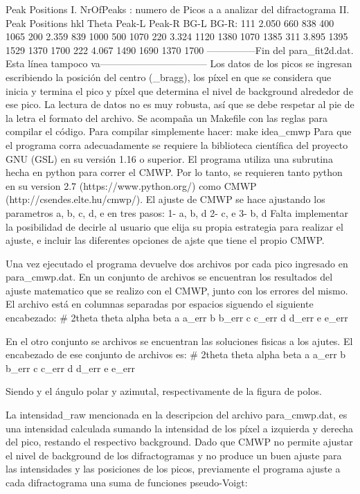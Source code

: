 Peak Positions
I. NrOfPeaks        : numero de Picos a a analizar del difractograma
II. Peak Positions
hkl Theta Peak-L Peak-R BG-L BG-R:
111 2.050 660 838 400 1065
200 2.359 839 1000 500 1070
220 3.324 1120 1380 1070 1385
311 3.895 1395 1529 1370 1700
222 4.067 1490 1690 1370 1700
---------------Fin del para_fit2d.dat. Esta línea tampoco va---------------------------------
Los datos de los picos se ingresan escribiendo la posición del centro (\theta_{bragg}), los píxel en que se considera que inicia y termina el pico y píxel que determina el nivel de background alrededor de ese pico.
La lectura de datos no es muy robusta, así que se debe respetar al pie de la letra el formato del archivo.
Se acompaña un Makefile con las reglas para compilar el código. Para compilar simplemente hacer:
make idea_cmwp
Para que el programa corra adecuadamente se requiere la biblioteca científica del proyecto GNU (GSL) en su versión 1.16 o superior.
El programa utiliza una subrutina hecha en python para correr el CMWP. Por lo tanto, se requieren tanto python en su version 2.7 (https://www.python.org/) como CMWP (http://csendes.elte.hu/cmwp/).
El ajuste de CMWP se hace ajustando los parametros a, b, c, d, e en tres pasos:
1- a, b, d
2- c, e
3- b, d
Falta implementar la posibilidad de decirle al usuario que elija su propia estrategia para realizar el ajuste, e incluir las diferentes opciones de ajste que tiene el propio CMWP.

Una vez ejecutado el programa devuelve dos archivos por cada pico ingresado en para_cmwp.dat. En un conjunto de archivos se encuentran los resultados del ajuste matematico que se realizo con el CMWP, junto con los errores del mismo. El archivo está en columnas separadas por espacios siguendo el siguiente encabezado:
#    2theta theta  alpha  beta     a a_err b b_err c c_err d d_err e e_err

En el otro conjunto se archivos se encuentran las soluciones fisicas a los ajutes. El encabezado de ese conjunto de archivos es:
#    2theta theta  alpha  beta     a a_err b b_err c c_err d d_err e e_err

Siendo \alpha y \beta el ángulo polar y azimutal, respectivamente de la figura de polos. 


La intensidad_raw mencionada en la descripcion del archivo para_cmwp.dat, es una intensidad calculada sumando la intensidad de los píxel a izquierda y derecha del pico, restando el respectivo background.
Dado que CMWP no permite ajustar el nivel de background de los difractogramas y no produce un buen ajuste para las intensidades y las posiciones de los picos, previamente el programa ajuste a cada difractograma una suma de funciones pseudo-Voigt:

